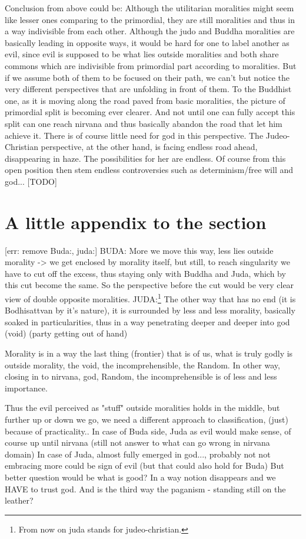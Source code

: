 \documentclass[10pt]{book}
\begin{document}
Conclusion from above could be: Although the utilitarian moralities might seem like lesser ones comparing to the primordial, they are still moralities and thus in a way indivisible from each other. Although the judo and Buddha moralities are basically leading in opposite ways, it would be hard for one to label another as evil, since evil is supposed to be what lies outside moralities and both share commons which are indivisible from primordial part according to moralities. 
But if we assume both of them to be focused on their path, we can't but notice the very different perspectives that are unfolding in front of them. To the Buddhist one, as it is moving along the road paved from basic moralities, the picture of primordial split is becoming ever clearer. And not until one can fully accept this split can one reach nirvana and thus basically abandon the road that let him achieve it. There is of course little need for god in this perspective.
The Judeo-Christian perspective, at the other hand, is facing endless road ahead, disappearing in haze. The possibilities for her are endless. Of course from this open position then stem endless controversies such as determinism/free will and god... [TODO] 

\section{A little appendix to the section}

[err: remove Buda:, juda:]
BUDA: More we move this way, less lies outside morality -> we get enclosed by morality itself, but still, to reach singularity we have to cut off the excess, thus staying only with Buddha and Juda, which by this cut become the same. So the perspective before the cut would be very clear view of double opposite moralities.
JUDA:\footnote{From now on juda stands for judeo-christian.} The other way that has no end (it is Bodhisattvan by it's nature), it is surrounded by less and less morality, basically soaked in particularities, thus in a way penetrating deeper and deeper into god (void) (party getting out of hand)

Morality is in a way the last thing (frontier) that is of us, what is truly godly is outside morality, the void, the incomprehensible, the Random. In other way, closing in to nirvana, god, Random, the incomprehensible is of less and less importance. 

Thus the evil perceived as "stuff" outside moralities holds in the middle, but further up or down we go, we need a different approach to classification, (just) because of practicality.. In case of Buda side, Juda as evil would make sense, of course up until nirvana (still not answer to what can go wrong in nirvana domain) In case of Juda, almost fully emerged in god..., probably not not embracing more could be sign of evil (but that could also hold for Buda) But better question would be what is good? In a way notion disappears and we HAVE to trust god.
And is the third way the paganism - standing still on the leather?
\end{document}
